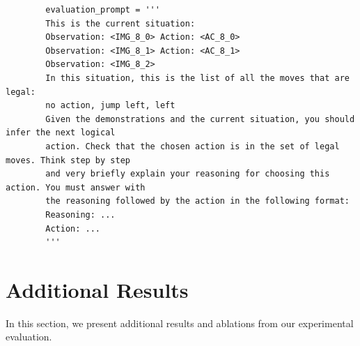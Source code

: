 \documentclass{article}
\newcommand{\eg}{e.g., }
\begin{document}
\begin{listing}
    \caption{
        The dynamic part of the evaluation prompt containing the evaluation trajectory.
        While stepping through an environment, we append this prompt to the one in \cref{code:frozen-prompt} in every evaluation step (\eg for the 3rd step here), again replacing the observation and action placeholders with the actual observations and actions.
        This example also shows the legal moves (lines $8$ to $10$) and uses chain-of-thought prompting (lines $12$ to $17$, \citet{wei2022chain}), both of which may be omitted depending on our ablations in \cref{app:additional-results:ablations} (which can vary for each model-task combination).
    }
    \label{code:dynamic-prompt}
    \begin{verbatim}
        evaluation_prompt = '''
        This is the current situation:
        Observation: <IMG_8_0> Action: <AC_8_0>
        Observation: <IMG_8_1> Action: <AC_8_1>
        Observation: <IMG_8_2>
        In this situation, this is the list of all the moves that are legal:
        no action, jump left, left
        Given the demonstrations and the current situation, you should infer the next logical
        action. Check that the chosen action is in the set of legal moves. Think step by step
        and very briefly explain your reasoning for choosing this  action. You must answer with
        the reasoning followed by the action in the following format:
        Reasoning: ...
        Action: ...
        '''
    \end{verbatim}
\end{listing}
    \section{Additional Results}
\label{app:additional-results}
In this section, we present additional results and ablations from our experimental evaluation.
\end{document}
